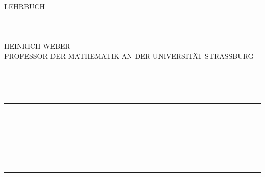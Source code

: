 \begin{center}
{\Huge LEHRBUCH}\\[3ex]
{\small {}}\\[3ex]
{\Huge {}}\\[6ex]
{\small {}}\\[3ex]
{\LARGE HEINRICH WEBER}\\[0.5ex]
{\small PROFESSOR DER MATHEMATIK AN DER UNIVERSITÄT STRASSBURG}\\[4ex]
\rule{2cm}{0.4pt}\\[6ex]
{\Large \textbf{}}\\[6ex]
\rule{2cm}{0.4pt}\\[6ex]
{\Large {}}\\[2ex]
\rule{1.5cm}{0.4pt}\\[2ex]
{\small {}}\\[10ex]
\rule{\textwidth}{1pt}\\[4ex]
{\large {}}\\[1ex]
{\small {}}\\[1ex]
{\large {}}
\end{center}
